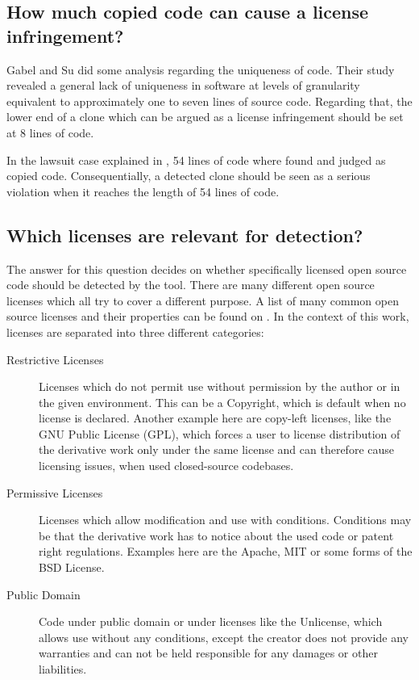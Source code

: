 \subsection*{How much copied code can cause a license infringement?}\label{section:preliminaries/infringement/how_much_code}
Gabel and Su did some analysis regarding the uniqueness of code.
Their study \glqq revealed a general lack of uniqueness in software at levels of granularity equivalent to approximately one to seven lines of source code\grqq \cite{2010-gabel-su-source-code-uniqueness}.
Regarding that, the lower end of a clone which can be argued as a license infringement should be set at 8 lines of code.

In the lawsuit case explained in \cite{mertzel2008copying}, 54 lines of code where found and judged as copied code.
Consequentially, a detected clone should be seen as a serious violation when it reaches the length of 54 lines of code.

\subsection*{Which licenses are relevant for detection?}\label{section:preliminaries/infringement/relevant_licenses}
The answer for this question decides on whether specifically licensed open source code should be detected by the tool.
There are many different open source licenses which all try to cover a different purpose.
A list of many common open source licenses and their properties can be found on \cite{licenses}.
In the context of this work, licenses are separated into three different categories:

\begin{description}
	\item[Restrictive Licenses] Licenses which do not permit use without permission by the author or in the given environment.
		This can be a Copyright, which is default when no license is declared.
		Another example here are copy-left licenses, like the GNU Public License (GPL), which forces a user to license distribution of the derivative work only under the same license and can therefore cause licensing issues, when used closed-source codebases.
	\item[Permissive Licenses]
		Licenses which allow modification and use with conditions.
		Conditions may be that the derivative work has to notice about the used code or patent right regulations.
		Examples here are the Apache, MIT or some forms of the BSD License.
	\item[Public Domain] 
		Code under public domain or under licenses like the Unlicense, which allows use without any conditions, except the creator does not provide any warranties and can not be held responsible for any damages or other liabilities.
\end{description}

